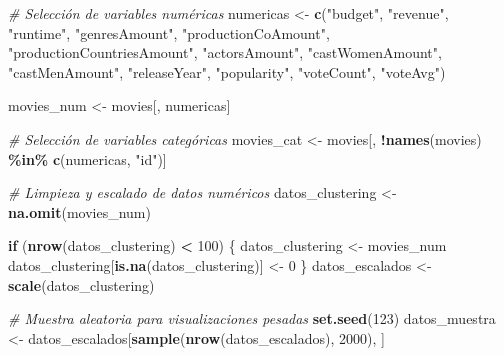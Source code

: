 \documentclass[
]{article}
\newenvironment{Shaded}{\begin{snugshade}}{\end{snugshade}}
\newcommand{\CommentTok}[1]{\textcolor[rgb]{0.56,0.35,0.01}{\textit{#1}}}
\newcommand{\ControlFlowTok}[1]{\textcolor[rgb]{0.13,0.29,0.53}{\textbf{#1}}}
\newcommand{\DecValTok}[1]{\textcolor[rgb]{0.00,0.00,0.81}{#1}}
\newcommand{\FunctionTok}[1]{\textcolor[rgb]{0.13,0.29,0.53}{\textbf{#1}}}
\newcommand{\NormalTok}[1]{#1}
\newcommand{\OtherTok}[1]{\textcolor[rgb]{0.56,0.35,0.01}{#1}}
\newcommand{\SpecialCharTok}[1]{\textcolor[rgb]{0.81,0.36,0.00}{\textbf{#1}}}
\newcommand{\StringTok}[1]{\textcolor[rgb]{0.31,0.60,0.02}{#1}}
\begin{document}
\begin{Shaded}
\begin{Highlighting}[]
\CommentTok{\# Selección de variables numéricas}
\NormalTok{numericas }\OtherTok{\textless{}{-}} \FunctionTok{c}\NormalTok{(}\StringTok{"budget"}\NormalTok{, }\StringTok{"revenue"}\NormalTok{, }\StringTok{"runtime"}\NormalTok{, }\StringTok{"genresAmount"}\NormalTok{, }\StringTok{"productionCoAmount"}\NormalTok{, }
               \StringTok{"productionCountriesAmount"}\NormalTok{, }\StringTok{"actorsAmount"}\NormalTok{, }\StringTok{"castWomenAmount"}\NormalTok{, }
               \StringTok{"castMenAmount"}\NormalTok{, }\StringTok{"releaseYear"}\NormalTok{, }\StringTok{"popularity"}\NormalTok{, }\StringTok{"voteCount"}\NormalTok{, }\StringTok{"voteAvg"}\NormalTok{)}

\NormalTok{movies\_num }\OtherTok{\textless{}{-}}\NormalTok{ movies[, numericas]}

\CommentTok{\# Selección de variables categóricas}
\NormalTok{movies\_cat }\OtherTok{\textless{}{-}}\NormalTok{ movies[, }\SpecialCharTok{!}\FunctionTok{names}\NormalTok{(movies) }\SpecialCharTok{\%in\%} \FunctionTok{c}\NormalTok{(numericas, }\StringTok{"id"}\NormalTok{)]}

\CommentTok{\# Limpieza y escalado de datos numéricos}
\NormalTok{datos\_clustering }\OtherTok{\textless{}{-}} \FunctionTok{na.omit}\NormalTok{(movies\_num)}

\ControlFlowTok{if}\NormalTok{ (}\FunctionTok{nrow}\NormalTok{(datos\_clustering) }\SpecialCharTok{\textless{}} \DecValTok{100}\NormalTok{) \{}
\NormalTok{  datos\_clustering }\OtherTok{\textless{}{-}}\NormalTok{ movies\_num}
\NormalTok{  datos\_clustering[}\FunctionTok{is.na}\NormalTok{(datos\_clustering)] }\OtherTok{\textless{}{-}} \DecValTok{0}
\NormalTok{\}}
\NormalTok{datos\_escalados }\OtherTok{\textless{}{-}} \FunctionTok{scale}\NormalTok{(datos\_clustering)}

\CommentTok{\# Muestra aleatoria para visualizaciones pesadas}
\FunctionTok{set.seed}\NormalTok{(}\DecValTok{123}\NormalTok{)}
\NormalTok{datos\_muestra }\OtherTok{\textless{}{-}}\NormalTok{ datos\_escalados[}\FunctionTok{sample}\NormalTok{(}\FunctionTok{nrow}\NormalTok{(datos\_escalados), }\DecValTok{2000}\NormalTok{), ]}
\end{Highlighting}
\end{Shaded}
\end{document}
